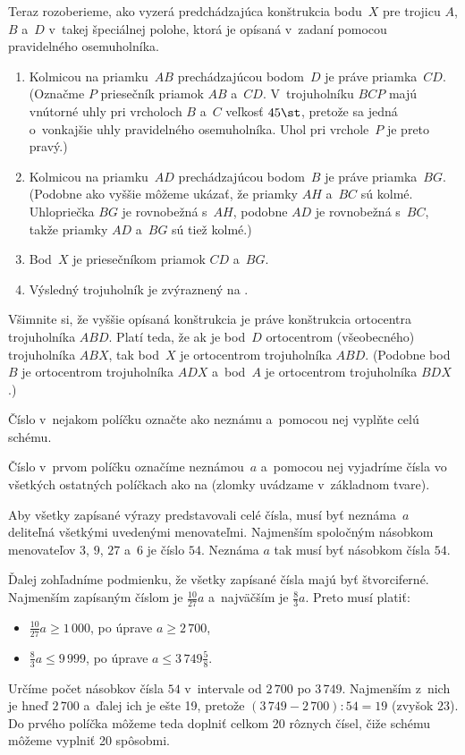 {\smallskip
Teraz rozoberieme, ako vyzerá predchádzajúca konštrukcia bodu~$X$ pre trojicu $A$, $B$
a~$D$ v~takej špeciálnej polohe, ktorá je opísaná v~zadaní pomocou
pravidelného osemuholníka.
\begin{enumerate}
\item Kolmicou na priamku~$AB$ prechádzajúcou bodom~$D$ je práve priamka~$CD$.
(Označme $P$ priesečník priamok $AB$ a~$CD$.
V~trojuholníku $BCP$ majú vnútorné uhly pri vrcholoch $B$ a~$C$ veľkosť
$45\st$, pretože sa jedná o~vonkajšie uhly pravidelného osemuholníka.
Uhol pri vrchole~$P$ je preto pravý.)
\item Kolmicou na priamku~$AD$ prechádzajúcou bodom~$B$ je práve priamka~$BG$.
(Podobne ako vyššie môžeme ukázať, že priamky $AH$ a~$BC$ sú kolmé.
Uhlopriečka $BG$ je rovnobežná s~$AH$, podobne $AD$ je rovnobežná s~$BC$,
takže priamky $AD$ a~$BG$ sú tiež kolmé.)
\item Bod~$X$ je priesečníkom priamok $CD$ a~$BG$.
\item Výsledný trojuholník je zvýraznený na \obr.
%
\end{enumerate}

\poznamka
Všimnite si, že vyššie opísaná konštrukcia je práve konštrukcia
ortocentra trojuholníka $ABD$.
Platí teda, že ak je
bod~$D$ ortocentrom (všeobecného) trojuholníka $ABX$, tak
bod~$X$ je ortocentrom trojuholníka $ABD$.
(Podobne bod~$B$ je ortocentrom trojuholníka $ADX$ a~bod~$A$ je ortocentrom
trojuholníka $BDX$.)}

{%
\napad
Číslo v~nejakom políčku označte ako neznámu a~pomocou nej vyplňte celú schému.

\riesenie
Číslo v~prvom políčku označíme neznámou~$a$ a~pomocou nej vyjadríme čísla vo
všetkých ostatných políčkach ako na \obr{} (zlomky uvádzame v~základnom tvare).

Aby všetky zapísané výrazy predstavovali celé čísla, musí byť neznáma~$a$
deliteľná všetkými uvedenými menovateľmi.
Najmenším spoločným násobkom menovateľov $3$, $9$, $27$ a~$6$ je číslo $54$.
Neznáma $a$ tak musí byť násobkom čísla $54$.

Ďalej zohľadníme podmienku, že všetky zapísané čísla majú byť štvorciferné.
Najmenším zapísaným číslom je $\frac{10}{27}a$ a~najväčším je
$\frac83a$.
Preto musí platiť:
\begin{itemize}
\item $\frac{10}{27}a\ge1\,000$, po úprave $a\ge2\,700$,
\item $\frac83a\le9\,999$, po úprave $a\le3\,749\frac58$.
\end{itemize}

Určíme počet násobkov čísla $54$ v~intervale od $2\,700$ po $3\,749$.
Najmenším z~nich je hneď $2\,700$ a~ďalej ich je ešte 19, pretože
$(3\,749-2\,700):54=19$ (zvyšok $23$).
Do prvého políčka môžeme teda doplniť celkom 20 rôznych čísel,
čiže schému môžeme vyplniť 20 spôsobmi.}

